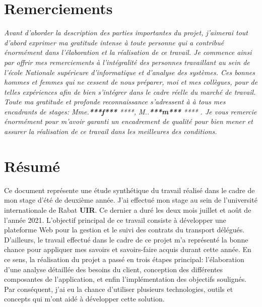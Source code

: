 \documentclass[a4paper]{report}
\begin{document}
 \setcounter{page}{1}
\begin{doublespace}
	\chapter*{\centering Remerciements}
	\textit{
		Avant d'aborder la description des parties importantes du projet,
		j'aimerai tout d’abord exprimer ma gratitude
		intense à toute personne qui a contribué énormément dans l'élaboration
		et la réalisation de ce travail. Je commence
		ainsi par offrir mes remerciements à l'intégralité des personnes
		travaillant au sein de l’école Nationale supérieure d’informatique et d’analyse
		des systèmes. Ces bonnes hommes et femmes qui ne cessent de nous préparer, moi
		et
		mes collègues, pour de telles expériences afin de bien s’intégrer dans
		le cadre réelle du marché de travail.
		Toute ma gratitude et profonde reconnaissance s’adressent à à tous mes
		encadrants de stages: Mme.\textbf{***f***} ****,
		M..\textbf{***m***} ****   . Je vous remercie énormément pour m'avoir
		garanti un encadrement de qualité pour bien mener
		et assurer la réalisation de ce travail dans les meilleures des
		conditions.
	}

	\newpage

	\chapter*{\centering Résumé}

	Ce document représente une étude synthétique du travail réalisé dans le
	cadre de mon stage d'été de deuxième année. J'ai effectué mon stage au sein de
	l'université internationale de Rabat \textbf{UIR}. Ce dernier a duré les deux
	mois juillet et août de l'année 2021. L’objectif principal de ce travail
	consiste à développer une plateforme Web pour la gestion et le suivi des
	contrats du transport délégués. D'ailleurs, le travail effectué dans le cadre
	de ce projet m'a représenté la bonne chance pour appliquer mes savoirs et
	savoirs-faire acquis durant cette année. En ce sens, la réalisation du projet a
	passé en trois étapes principal: l'élaboration d'une analyse détaillée des
	besoins du client, conception des différentes composantes de l'application, et
	enfin l'implémentation des objectifs soulignés. Par conséquent, j'ai eu la
	chance d'utiliser plusieurs technologies, outils et concepts qui m'ont aidé à
	développer cette solution.


\end{doublespace}
\end{document}
